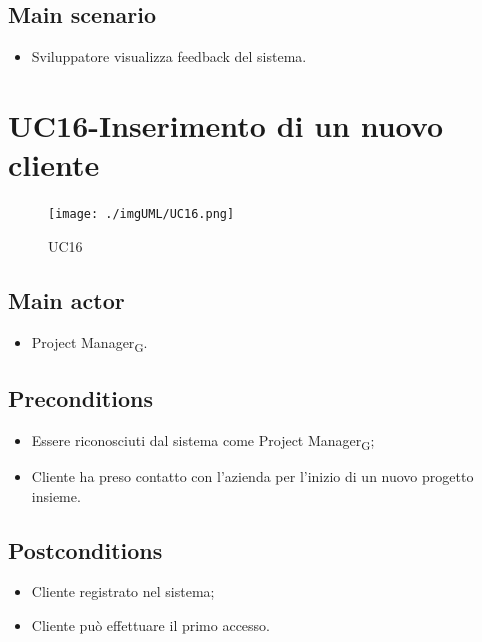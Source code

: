 \documentclass{article}
\begin{document}
    \subsection*{Main scenario}
        \begin{itemize}
            \item Sviluppatore visualizza feedback del sistema.
        \end{itemize}
    

        
\section{UC16-Inserimento di un nuovo cliente}
    \begin{figure}[h]
      \centering
      \texttt{[image: ./imgUML/UC16.png]}
    \caption{UC16}
      \label{fig:UC16}
    \end{figure}
    
    \subsection*{Main actor}
        \begin{itemize}
            \item Project Manager\textsubscript{G}.
        \end{itemize}
        
    \subsection*{Preconditions}
        \begin{itemize}
            \item Essere riconosciuti dal sistema come Project Manager\textsubscript{G};
            \item Cliente ha preso contatto con l'azienda per l'inizio di un nuovo progetto insieme.
        \end{itemize}
        
    \subsection*{Postconditions}
        \begin{itemize}
            \item Cliente registrato nel sistema;
            \item Cliente può effettuare il primo accesso.
        \end{itemize}
    
\end{document}
